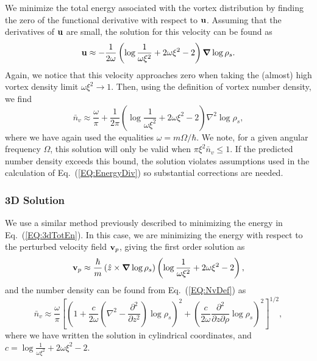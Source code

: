 \documentclass[onecolumn,nofootinbib,superscriptaddress]{revtex4}
\begin{document}
We minimize the total energy associated with the vortex distribution by finding the zero of the functional derivative with respect to ${\bf u}$.  Assuming that the derivatives of ${\bf u}$ are small, the solution for this velocity can be found as
\begin{equation}
{\bf u} \approx -\frac{1}{2\omega}\left(\log \frac{1}{\omega\xi^2}+2\omega\xi^2 -2\right){\boldsymbol \nabla} \log \rho_s.
\end{equation}
Again, we notice that this velocity approaches zero when taking the (almost) high vortex density limit $\omega\xi^2 \rightarrow 1$.  Then, using the definition of vortex number density, we find
\begin{equation}
\bar{n}_v \approx \frac{\omega}{\pi}+\frac{1}{2\pi}\left(\log \frac{1}{\omega\xi^2}+2\omega\xi^2 -2\right)\nabla^2\log\rho_s,
\end{equation}
where we have again used the equalities $\omega = m\Omega/\hbar$.  We note, for a given angular frequency $\Omega$, this solution will only be valid when $\pi \xi^2 \bar{n}_v \leq 1$.  If the predicted number density exceeds this bound, the solution violates assumptions used in the calculation of Eq.~(\ref{EQ:EnergyDiv}) so substantial corrections are needed.

\subsubsection{3D Solution}

We use a similar method previously described to minimizing the energy in Eq.~(\ref{EQ:3dTotEn}).  In this case, we are minimizing the energy with respect to the perturbed velocity field ${\bf v}_p$, giving the first order solution as
\begin{equation}
{\bf v}_p \approx \frac{\hbar}{m}\left(\hat{z}\times{\boldsymbol \nabla}\log\rho_s\right)\left(\log\frac{1}{\omega\xi^2}+2\omega\xi^2-2\right),
\end{equation}
and the number density can be found from Eq.~(\ref{EQ:NvDef}) as
\begin{equation}
\bar{n}_v \approx \frac{\omega}{\pi}\left[\left(1+\frac{c}{2\omega}\left(\nabla^2-\frac{\partial^2}{\partial z^2}\right)\log \rho_s\right)^2 + \left(\frac{c}{2\omega}\frac{\partial^2}{\partial z\partial \rho}\log\rho_s\right)^2\right]^{1/2},
\end{equation}
where we have written the solution in cylindrical coordinates, and $c = \log\frac{1}{\omega \xi^2}+2\omega \xi^2-2$.
\end{document}
